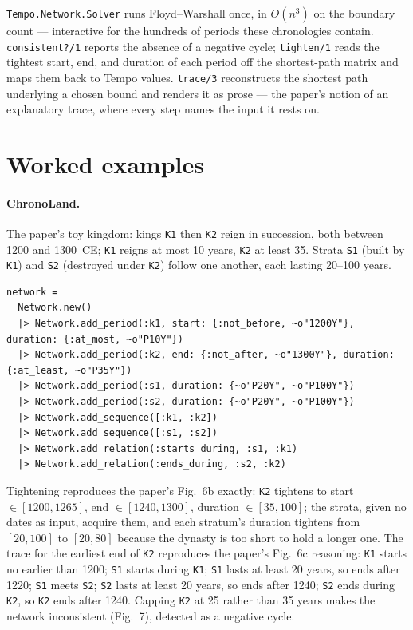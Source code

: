\documentclass[a4paper,USenglish,cleveref,autoref,thm-restate]{oasics-v2021}
\begin{document}
\texttt{Tempo.Network.Solver} runs Floyd--Warshall once, in $O(n^3)$ on
the boundary count --- interactive for the hundreds of periods these
chronologies contain. \texttt{consistent?/1} reports the absence of a
negative cycle; \texttt{tighten/1} reads the tightest start, end, and
duration of each period off the shortest-path matrix and maps them back
to Tempo values. \texttt{trace/3} reconstructs the shortest path
underlying a chosen bound and renders it as prose --- the paper's notion
of an explanatory trace, where every step names the input it rests on.

\section{Worked examples}
\label{sec:examples}

\paragraph{ChronoLand.} The paper's toy kingdom: kings \texttt{K1} then
\texttt{K2} reign in succession, both between 1200 and 1300~CE; \texttt{K1}
reigns at most 10 years, \texttt{K2} at least 35. Strata \texttt{S1}
(built by \texttt{K1}) and \texttt{S2} (destroyed under \texttt{K2})
follow one another, each lasting 20--100 years.

\begin{verbatim}
network =
  Network.new()
  |> Network.add_period(:k1, start: {:not_before, ~o"1200Y"}, duration: {:at_most, ~o"P10Y"})
  |> Network.add_period(:k2, end: {:not_after, ~o"1300Y"}, duration: {:at_least, ~o"P35Y"})
  |> Network.add_period(:s1, duration: {~o"P20Y", ~o"P100Y"})
  |> Network.add_period(:s2, duration: {~o"P20Y", ~o"P100Y"})
  |> Network.add_sequence([:k1, :k2])
  |> Network.add_sequence([:s1, :s2])
  |> Network.add_relation(:starts_during, :s1, :k1)
  |> Network.add_relation(:ends_during, :s2, :k2)
\end{verbatim}

Tightening reproduces the paper's Fig.~6b exactly: \texttt{K2} tightens
to start $\in [1200, 1265]$, end $\in [1240, 1300]$, duration $\in [35,
100]$; the strata, given no dates as input, acquire them, and each
stratum's duration tightens from $[20,100]$ to $[20,80]$ because the
dynasty is too short to hold a longer one. The trace for the earliest
end of \texttt{K2} reproduces the paper's Fig.~6c reasoning:
\texttt{K1} starts no earlier than 1200; \texttt{S1} starts during
\texttt{K1}; \texttt{S1} lasts at least 20 years, so ends after 1220;
\texttt{S1} meets \texttt{S2}; \texttt{S2} lasts at least 20 years, so
ends after 1240; \texttt{S2} ends during \texttt{K2}, so \texttt{K2}
ends after 1240. Capping \texttt{K2} at 25 rather than 35 years makes
the network inconsistent (Fig.~7), detected as a negative cycle.
\end{document}
